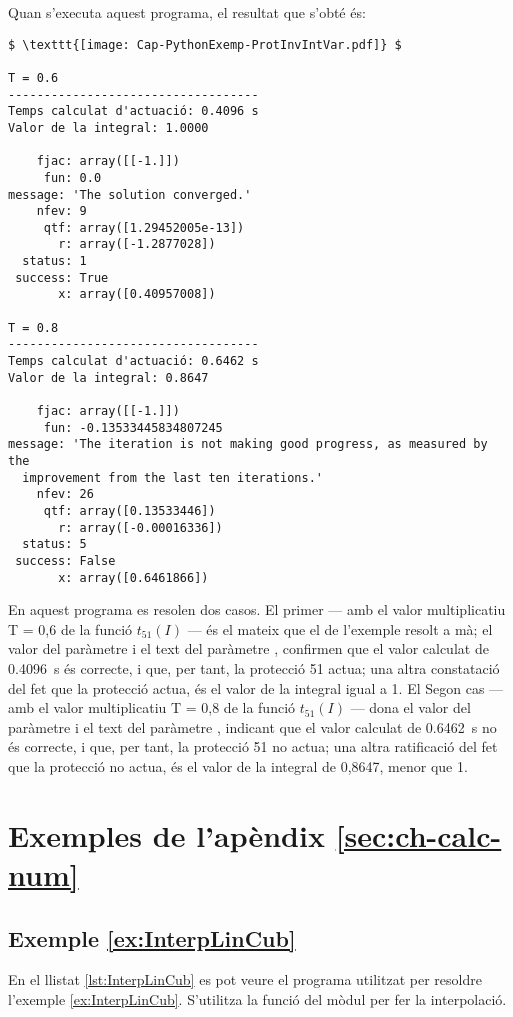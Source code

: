 Quan s'executa aquest programa, el resultat que s'obté és:
\lstset{
	language=,
	numbers=none,
	frame=none
}
\begin{lstlisting}[mathescape=true]
$ \texttt{[image: Cap-PythonExemp-ProtInvIntVar.pdf]} $

T = 0.6
-----------------------------------
Temps calculat d'actuació: 0.4096 s
Valor de la integral: 1.0000

    fjac: array([[-1.]])
     fun: 0.0
message: 'The solution converged.'
    nfev: 9
     qtf: array([1.29452005e-13])
       r: array([-1.2877028])
  status: 1
 success: True
       x: array([0.40957008])

T = 0.8
-----------------------------------
Temps calculat d'actuació: 0.6462 s
Valor de la integral: 0.8647

    fjac: array([[-1.]])
     fun: -0.13533445834807245
message: 'The iteration is not making good progress, as measured by the
  improvement from the last ten iterations.'
    nfev: 26
     qtf: array([0.13533446])
       r: array([-0.00016336])
  status: 5
 success: False
       x: array([0.6461866])
\end{lstlisting}


En aquest programa es resolen dos casos. El primer --- amb el valor multiplicatiu T = 0,6 de la funció $t_{51}(I)$ --- és el mateix que el de l'exemple resolt a mà; el valor  del paràmetre  i el text   del paràmetre , confirmen que el valor calculat de \qty{0,4096}{s} és correcte, i que, per tant, la protecció 51 actua; una altra constatació del fet que la protecció actua, és el valor de la integral igual a 1. El Segon cas --- amb el valor multiplicatiu T = 0,8 de la funció $t_{51}(I)$ --- dona el valor  del paràmetre  i el text   del paràmetre , indicant que el valor calculat de \qty{0,6462}{s} no és correcte, i que, per tant, la protecció 51 no actua; una altra ratificació del fet que la protecció no actua, és el valor de la integral de 0,8647, menor que 1. 


\section{Exemples de l'apèndix \ref*{sec:ch-calc-num}}

\hypertarget{exemple:InterpLinCub}{\subsection{Exemple \ref*{ex:InterpLinCub} \InterpLinCub}}
En el llistat \vref{lst:InterpLinCub} es pot veure el programa utilitzat per resoldre l'exemple \vref{ex:InterpLinCub}. S'utilitza la funció  del mòdul  per fer la interpolació.




